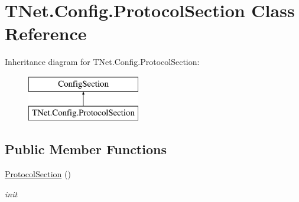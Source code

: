 \hypertarget{class_t_net_1_1_config_1_1_protocol_section}{}\section{T\+Net.\+Config.\+Protocol\+Section Class Reference}
\label{class_t_net_1_1_config_1_1_protocol_section}


 


Inheritance diagram for T\+Net.\+Config.\+Protocol\+Section\+:\begin{figure}[H]
\begin{center}
\leavevmode
\includegraphics[height=2.000000cm]{class_t_net_1_1_config_1_1_protocol_section}
\end{center}
\end{figure}
\subsection*{Public Member Functions}
\begin{DoxyCompactItemize}
\item 
\mbox{\hyperlink{class_t_net_1_1_config_1_1_protocol_section_a9f3b2d889f2fc72ace52a021be91b901}{Protocol\+Section}} ()
\begin{DoxyCompactList}\small\item\em init \end{DoxyCompactList}\end{DoxyCompactItemize}
